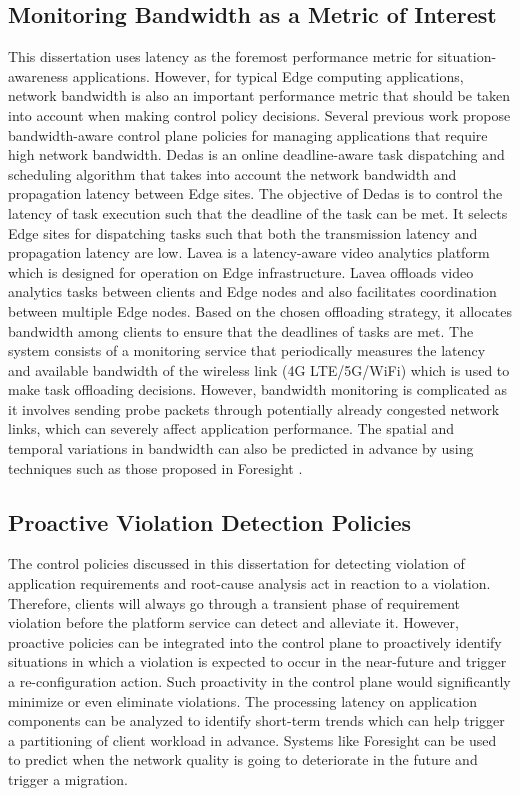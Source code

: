 \subsection{Monitoring Bandwidth as a Metric of Interest}
This dissertation uses latency as the foremost performance metric for situation-awareness applications. However, for typical Edge computing applications, network bandwidth is also an important performance metric that should be taken into account when making control policy decisions. Several previous work propose bandwidth-aware control plane policies for managing applications that require high network bandwidth. Dedas \cite{dedas} is an online deadline-aware task dispatching and scheduling algorithm that takes into account the network bandwidth and propagation latency between Edge sites. The objective of Dedas is to control the latency of task execution such that the deadline of the task can be met. It selects Edge sites for dispatching tasks such that both the transmission latency and propagation latency are low. Lavea \cite{lavea} is a latency-aware video analytics platform which is designed for operation on Edge infrastructure. Lavea offloads video analytics tasks between clients and Edge nodes and also facilitates coordination between multiple Edge nodes. Based on the chosen offloading strategy, it allocates bandwidth among clients to ensure that the deadlines of tasks are met. The system consists of a monitoring service that periodically measures the latency and available bandwidth of the wireless link (4G LTE/5G/WiFi) which is used to make task offloading decisions. However, bandwidth monitoring is complicated as it involves sending probe packets through potentially already congested network links, which can severely affect application performance. The spatial and temporal variations in bandwidth can also be predicted in advance by using techniques such as those proposed in Foresight \cite{foresight}.

\subsection{Proactive Violation Detection Policies}
The control policies discussed in this dissertation for detecting violation of application requirements and root-cause analysis act in reaction to a violation. Therefore, clients will always go through a transient phase of requirement violation before the platform service can detect and alleviate it. However, proactive policies can be integrated into the control plane to proactively identify situations in which a violation is expected to occur in the near-future and trigger a re-configuration action. Such proactivity in the control plane would significantly minimize or even eliminate violations. The processing latency on application components can be analyzed to identify short-term trends which can help trigger a partitioning of client workload in advance. Systems like Foresight \cite{foresight} can be used to predict when the network quality is going to deteriorate in the future and trigger a migration.